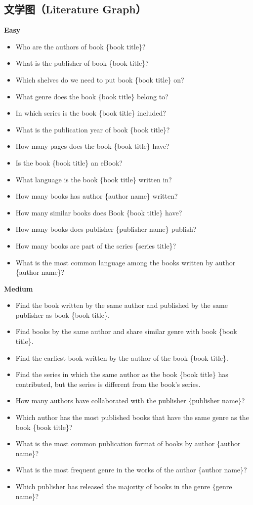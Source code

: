 \documentclass[11pt,UTF8,fontset=fandol]{ctexart}
\begin{document}
\subsection*{文学图（Literature Graph）}
\noindent\textbf{Easy}
\begin{itemize}[leftmargin=1.4em,nosep]
\item Who are the authors of book \{book title\}?
\item What is the publisher of book \{book title\}?
\item Which shelves do we need to put book \{book title\} on?
\item What genre does the book \{book title\} belong to?
\item In which series is the book \{book title\} included?
\item What is the publication year of book \{book title\}?
\item How many pages does the book \{book title\} have?
\item Is the book \{book title\} an eBook?
\item What language is the book \{book title\} written in?
\item How many books has author \{author name\} written?
\item How many similar books does Book \{book title\} have?
\item How many books does publisher \{publisher name\} publish?
\item How many books are part of the series \{series title\}?
\item What is the most common language among the books written by author \{author name\}?
\end{itemize}
\noindent\textbf{Medium}
\begin{itemize}[leftmargin=1.4em,nosep]
\item Find the book written by the same author and published by the same publisher as book \{book title\}.
\item Find books by the same author and share similar genre with book \{book title\}.
\item Find the earliest book written by the author of the book \{book title\}.
\item Find the series in which the same author as the book \{book title\} has contributed, but the series is different from the book's series.
\item How many authors have collaborated with the publisher \{publisher name\}?
\item Which author has the most published books that have the same genre as the book \{book title\}?
\item What is the most common publication format of books by author \{author name\}?
\item What is the most frequent genre in the works of the author \{author name\}?
\item Which publisher has released the majority of books in the genre \{genre name\}?
\end{itemize}
\end{document}
